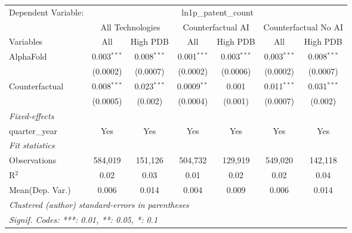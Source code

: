 \begingroup
\centering
\begin{tabular}{lcccccc}
   \tabularnewline \midrule \midrule
   Dependent Variable: & \multicolumn{6}{c}{ln1p\_patent\_count}\\
 & \multicolumn{2}{c}{All Technologies} & \multicolumn{2}{c}{Counterfactual AI} & \multicolumn{2}{c}{Counterfactual No AI} \\
\cmidrule(lr){1-1}\cmidrule(lr){2-3} \cmidrule(lr){4-5} \cmidrule(lr){6-7}
Variables & \multicolumn{1}{c}{All} & \multicolumn{1}{c}{High PDB} & \multicolumn{1}{c}{All} & \multicolumn{1}{c}{High PDB} & \multicolumn{1}{c}{All} & \multicolumn{1}{c}{High PDB} \\
\cmidrule(lr){1-1}\cmidrule(lr){2-2} \cmidrule(lr){3-3} \cmidrule(lr){4-4} \cmidrule(lr){5-5} \cmidrule(lr){6-6} \cmidrule(lr){7-7}
   AlphaFold      & 0.003$^{***}$ & 0.008$^{***}$ & 0.001$^{***}$ & 0.003$^{***}$ & 0.003$^{***}$ & 0.008$^{***}$\\   
                  & (0.0002)      & (0.0007)      & (0.0002)      & (0.0006)      & (0.0002)      & (0.0007)\\   
   Counterfactual & 0.008$^{***}$ & 0.023$^{***}$ & 0.0009$^{**}$ & 0.001         & 0.011$^{***}$ & 0.031$^{***}$\\   
                  & (0.0005)      & (0.002)       & (0.0004)      & (0.001)       & (0.0007)      & (0.002)\\   
   \midrule
   \emph{Fixed-effects}\\
   quarter\_year  & Yes           & Yes           & Yes           & Yes           & Yes           & Yes\\  
   \midrule
   \emph{Fit statistics}\\
   Observations   & 584,019       & 151,126       & 504,732       & 129,919       & 549,020       & 142,118\\  
   R$^2$          & 0.02          & 0.03          & 0.01          & 0.02          & 0.02          & 0.04\\  
Mean(Dep. Var.) & 0.006 & 0.014 & 0.004 & 0.009 & 0.006 & 0.014 \\
   \midrule \midrule
   \multicolumn{7}{l}{\emph{Clustered (author) standard-errors in parentheses}}\\
   \multicolumn{7}{l}{\emph{Signif. Codes: ***: 0.01, **: 0.05, *: 0.1}}\\
\end{tabular}
\par\endgroup
